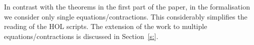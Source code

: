 In contrast with the theorems in the first part of the paper, in the
formalisation we consider only single equations/contractions. 
This considerably simplifies the  reading of the HOL scripts. 
The extension of the work to multiple equations/contractions is
discussed in Section~\ref{s:}.




